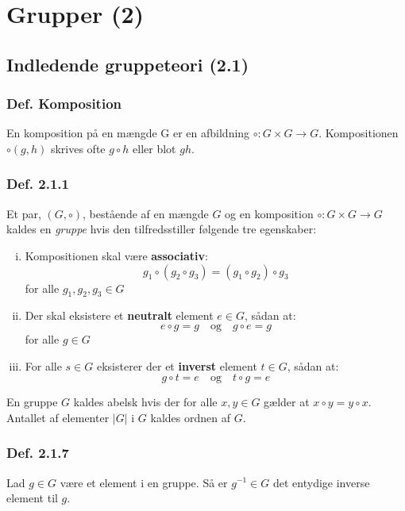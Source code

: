 \section{Grupper (2)}
\subsection{Indledende gruppeteori (2.1)}
\subsubsection{Def. Komposition}
En komposition på en mængde G er en afbildning $\circ: G \times G \rightarrow G$.
Kompositionen $\circ(g, h)$ skrives ofte $g \circ h$ eller blot $gh$.

\subsubsection{Def. 2.1.1}
Et par, $(G, \circ)$, bestående af en mængde $G$ og en komposition $\circ: G
\times G \rightarrow G$ kaldes en \textit{gruppe} hvis den tilfredsstiller
følgende tre egenskaber:
\begin{enumerate}[(i)]
  \item Kompositionen skal være \textbf{associativ}:
  \begin{equation*}
  g_1 \circ (g_2 \circ g_3) = (g_1 \circ g_2) \circ g_3
  \end{equation*}
  for alle $g_1, g_2, g_3 \in G$
  
  \item Der skal eksistere et \textbf{neutralt} element $e \in G$, sådan at:
  \begin{equation*}
  e \circ g = g \quad \text{og}\quad g \circ e = g
  \end{equation*}
  for alle $g \in G$
  
  \item For alle $s \in G$ eksisterer der et \textbf{inverst} element $t \in G$, sådan
  at: 
  \begin{equation*}
  g \circ t = e \quad \text{og} \quad t \circ g = e
  \end{equation*}
\end{enumerate}
En gruppe $G$ kaldes abelsk hvis der for alle $x, y \in G$ gælder at $x \circ y
= y \circ x$. Antallet af elementer $|G|$ i $G$ kaldes ordnen af $G$.

\subsubsection{Def. 2.1.7}
Lad $g \in G$ være et element i en gruppe. Så er $g^{-1} \in G$ det entydige
inverse element til $g$.

